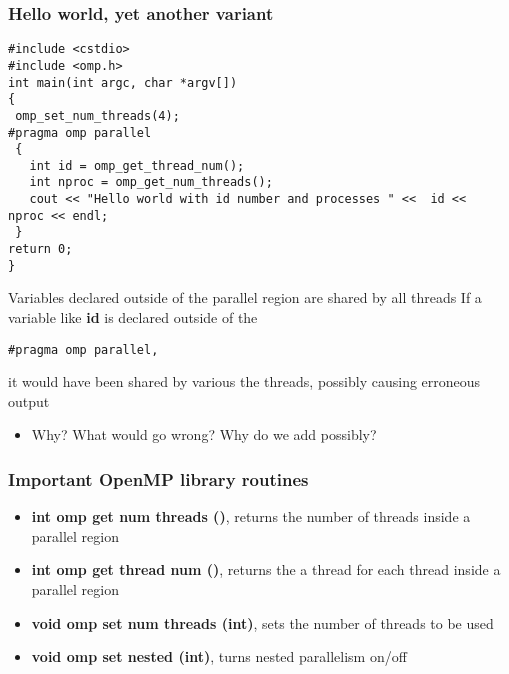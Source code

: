 \documentclass{beamer}
\begin{document}
\begin{frame}
\frametitle{Hello world, yet another variant}

\begin{block}{}














\begin{verbatim}
#include <cstdio>
#include <omp.h>
int main(int argc, char *argv[]) 
{
 omp_set_num_threads(4); 
#pragma omp parallel
 {
   int id = omp_get_thread_num();
   int nproc = omp_get_num_threads(); 
   cout << "Hello world with id number and processes " <<  id <<  nproc << endl;
 } 
return 0;
}

\end{verbatim}

Variables declared outside of the parallel region are shared by all threads
If a variable like \textbf{id} is  declared outside of the 


\begin{verbatim}
#pragma omp parallel, 

\end{verbatim}

it would have been shared by various the threads, possibly causing erroneous output
\begin{itemize}
 \item Why? What would go wrong? Why do we add  possibly?
\end{itemize}

\noindent
\end{block}
\end{frame}

\begin{frame}
\frametitle{Important OpenMP library routines}

\begin{block}{}

\begin{itemize}
\item \textbf{int omp get num threads ()}, returns the number of threads inside a parallel region

\item \textbf{int omp get thread num ()},  returns the  a thread for each thread inside a parallel region

\item \textbf{void omp set num threads (int)}, sets the number of threads to be used

\item \textbf{void omp set nested (int)},  turns nested parallelism on/off
\end{itemize}

\noindent
\end{block}
\end{frame}
\end{document}
